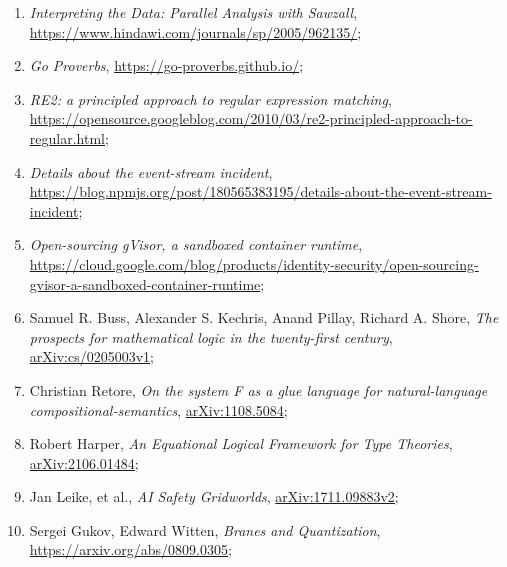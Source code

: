 \documentclass[a4paper,11pt]{article}
\begin{document}
\begin{enumerate}
\item \emph{Interpreting the Data: Parallel Analysis with Sawzall},
  \href{https://www.hindawi.com/journals/sp/2005/962135/}{https://www.hindawi.com/journals/sp/2005/962135/};

\item \emph{Go Proverbs},
  \href{https://go-proverbs.github.io/}{https://go-proverbs.github.io/};

\item \emph{RE2: a principled approach to regular expression
    matching}, \\
  \href{https://opensource.googleblog.com/2010/03/re2-principled-approach-to-regular.html}{https://opensource.googleblog.com/2010/03/re2-principled-approach-to-regular.html};

\item \emph{Details about the event-stream incident}, \\
  \href{https://blog.npmjs.org/post/180565383195/details-about-the-event-stream-incident}{https://blog.npmjs.org/post/180565383195/details-about-the-event-stream-incident};

\item \emph{Open-sourcing gVisor, a sandboxed container runtime}, \\
  \href{https://cloud.google.com/blog/products/identity-security/open-sourcing-gvisor-a-sandboxed-container-runtime}{https://cloud.google.com/blog/products/identity-security/open-sourcing-gvisor-a-sandboxed-container-runtime};

\item Samuel R. Buss, Alexander S. Kechris, Anand Pillay, Richard A.
  Shore, \emph{The prospects for mathematical logic in the
    twenty-first century},
  \href{https://arxiv.org/abs/cs/0205003v1}{arXiv:cs/0205003v1};

\item Christian Retore, \emph{On the system F as a glue language for
    natural-language compositional-semantics},
  \href{https://arxiv.org/abs/1108.5084}{arXiv:1108.5084};

\item Robert Harper, \emph{An Equational Logical Framework for Type
    Theories},
  \href{https://arxiv.org/abs/2106.01484}{arXiv:2106.01484};

\item Jan Leike, et al., \emph{AI Safety Gridworlds},
  \href{https://arxiv.org/abs/1711.09883}{arXiv:1711.09883v2};

\item Sergei Gukov, Edward Witten, \emph{Branes and Quantization},
  \href{https://arxiv.org/abs/0809.0305}{https://arxiv.org/abs/0809.0305};


\end{enumerate}
\end{document}
